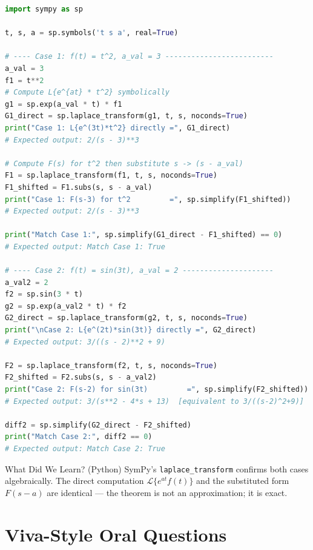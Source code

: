 \documentclass[12pt,a4paper]{article}
\begin{document}
\begin{lstlisting}[language=Python, caption={Verifying the First Shifting Theorem with SymPy}]
import sympy as sp

t, s, a = sp.symbols('t s a', real=True)

# ---- Case 1: f(t) = t^2, a_val = 3 -------------------------
a_val = 3
f1 = t**2
# Compute L{e^{at} * t^2} symbolically
g1 = sp.exp(a_val * t) * f1
G1_direct = sp.laplace_transform(g1, t, s, noconds=True)
print("Case 1: L{e^(3t)*t^2} directly =", G1_direct)
# Expected output: 2/(s - 3)**3

# Compute F(s) for t^2 then substitute s -> (s - a_val)
F1 = sp.laplace_transform(f1, t, s, noconds=True)
F1_shifted = F1.subs(s, s - a_val)
print("Case 1: F(s-3) for t^2         =", sp.simplify(F1_shifted))
# Expected output: 2/(s - 3)**3

print("Match Case 1:", sp.simplify(G1_direct - F1_shifted) == 0)
# Expected output: Match Case 1: True

# ---- Case 2: f(t) = sin(3t), a_val = 2 ---------------------
a_val2 = 2
f2 = sp.sin(3 * t)
g2 = sp.exp(a_val2 * t) * f2
G2_direct = sp.laplace_transform(g2, t, s, noconds=True)
print("\nCase 2: L{e^(2t)*sin(3t)} directly =", G2_direct)
# Expected output: 3/((s - 2)**2 + 9)

F2 = sp.laplace_transform(f2, t, s, noconds=True)
F2_shifted = F2.subs(s, s - a_val2)
print("Case 2: F(s-2) for sin(3t)         =", sp.simplify(F2_shifted))
# Expected output: 3/(s**2 - 4*s + 13)  [equivalent to 3/((s-2)^2+9)]

diff2 = sp.simplify(G2_direct - F2_shifted)
print("Match Case 2:", diff2 == 0)
# Expected output: Match Case 2: True
\end{lstlisting}

\begin{learnbox}{What Did We Learn? (Python)}
SymPy's \texttt{laplace\_transform} confirms both cases algebraically.
The direct computation $\mathcal{L}\{e^{at}f(t)\}$ and the substituted form $F(s-a)$
are identical --- the theorem is not an approximation; it is exact.
\end{learnbox}

\section{Viva-Style Oral Questions}
\end{document}
